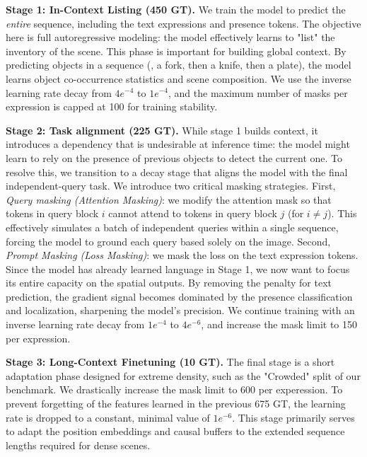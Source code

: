 \noindent \textbf{Stage 1: In-Context Listing (450 GT).} We train the model to predict the \textit{entire} sequence, including the text expressions and presence tokens. The objective here is full autoregressive modeling: the model effectively learns to "list" the inventory of the scene. This phase is important for building global context. By predicting objects in a sequence (\eg, a fork, then a knife, then a plate), the model learns object co-occurrence statistics and scene composition. We use the inverse learning rate decay from $4e^{-4}$ to $1e^{-4}$, and the maximum number of masks per expression is capped at 100 for training stability.

\noindent \textbf{Stage 2: Task alignment (225 GT).} While stage 1 builds context, it introduces a dependency that is undesirable at inference time: the model might learn to rely on the presence of previous objects to detect the current one. To resolve this, we transition to a decay stage that aligns the model with the final independent-query task. We introduce two critical masking strategies. First, \textit{Query masking (Attention Masking)}: we modify the attention mask so that tokens in query block $i$ cannot attend to tokens in query block $j$ (for $i \neq j$). This effectively simulates a batch of independent queries within a single sequence, forcing the model to ground each query based solely on the image. Second, \textit{Prompt Masking (Loss Masking)}: we mask the loss on the text expression tokens. Since the model has already learned language in Stage 1, we now want to focus its entire capacity on the spatial outputs. By removing the penalty for text prediction, the gradient signal becomes dominated by the presence classification and localization, sharpening the model's precision. We continue training with an inverse learning rate decay from $1e^{-4}$ to $4e^{-6}$, and increase the mask limit to 150 per expression.

\noindent \textbf{Stage 3: Long-Context Finetuning (10 GT).} The final stage is a short adaptation phase designed for extreme density, such as the "Crowded" split of our benchmark. We drastically increase the mask limit to 600 per experession. To prevent forgetting of the features learned in the previous 675 GT, the learning rate is dropped to a constant, minimal value of $1e^{-6}$. This stage primarily serves to adapt the position embeddings and causal buffers to the extended sequence lengths required for dense scenes.
